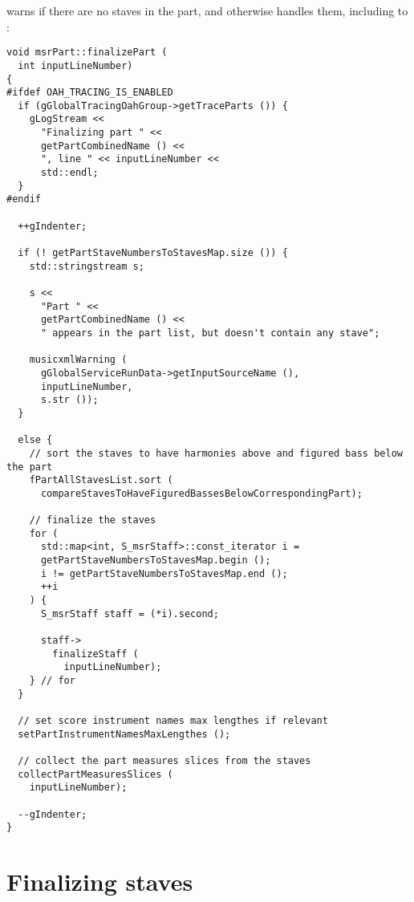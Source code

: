  warns if there are no staves in the part, and otherwise handles them, including \cascading to :
\begin{lstlisting}[language=CPlusPlus]
void msrPart::finalizePart (
  int inputLineNumber)
{
#ifdef OAH_TRACING_IS_ENABLED
  if (gGlobalTracingOahGroup->getTraceParts ()) {
    gLogStream <<
      "Finalizing part " <<
      getPartCombinedName () <<
      ", line " << inputLineNumber <<
      std::endl;
  }
#endif

  ++gIndenter;

  if (! getPartStaveNumbersToStavesMap.size ()) {
    std::stringstream s;

    s <<
      "Part " <<
      getPartCombinedName () <<
      " appears in the part list, but doesn't contain any stave";

    musicxmlWarning (
      gGlobalServiceRunData->getInputSourceName (),
      inputLineNumber,
      s.str ());
  }

  else {
    // sort the staves to have harmonies above and figured bass below the part
    fPartAllStavesList.sort (
      compareStavesToHaveFiguredBassesBelowCorrespondingPart);

    // finalize the staves
    for (
      std::map<int, S_msrStaff>::const_iterator i =
      getPartStaveNumbersToStavesMap.begin ();
      i != getPartStaveNumbersToStavesMap.end ();
      ++i
    ) {
      S_msrStaff staff = (*i).second;

      staff->
        finalizeStaff (
          inputLineNumber);
    } // for
  }

  // set score instrument names max lengthes if relevant
  setPartInstrumentNamesMaxLengthes ();

  // collect the part measures slices from the staves
  collectPartMeasuresSlices (
    inputLineNumber);

  --gIndenter;
}
\end{lstlisting}



\section{Finalizing staves}

